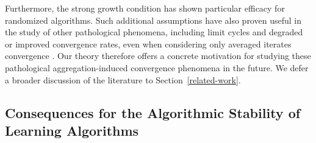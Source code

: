 \documentclass[twoside,11pt]{article}
\begin{document}
Furthermore, the strong growth condition \citep[or interpolation regime,][and reference therein]{schmidt2013fast, pmlr-v80-ma18a, liu2024revisiting, attia2026fast} has shown particular efficacy for randomized algorithms.
Such additional assumptions have also proven useful in the study of other pathological phenomena, including limit cycles and degraded or improved convergence rates, even when considering only averaged iterates convergence \citep[see, e.g.,][Theorem IV; \citealp{allouah2024adaptiveclipping}, Theorem 5.2]{karimireddy2022byzantinerobust}.
Our theory therefore offers a concrete motivation for studying these pathological aggregation-induced convergence phenomena in the future.
We defer a broader discussion of the literature to Section~\ref{related-work}.



\subsection{Consequences for the Algorithmic Stability of Learning Algorithms}\label{sec:stabilityimplications}
\end{document}
